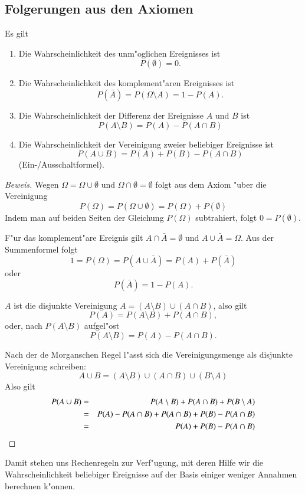 \subsection{Folgerungen aus den Axiomen}
\begin{satz}Es gilt
\begin{enumerate}
\item Die Wahrscheinlichkeit des unm"oglichen Ereignisses ist
\[
P(\emptyset) = 0.
\]
\item Die Wahrscheinlichkeit des komplement"aren Ereignisses
ist
\[
P(\bar A) = P(\Omega\setminus A) = 1 -P(A).
\]
\item Die Wahrscheinlichkeit der Differenz der Ereignisse $A$ und $B$
ist
\[
P(A\setminus B) = P(A) - P(A\cap B)
\]
\item Die Wahrscheinlichkeit der Vereinigung zweier beliebiger Ereignisse
ist
\[
P(A\cup B) = P(A) + P(B) - P(A\cap B)
\]
(Ein-/Ausschaltformel).
\end{enumerate}
\end{satz}

\begin{proof}[Beweis]
Wegen $\Omega = \Omega \cup\emptyset$ und
$\Omega\cap\emptyset = \emptyset$ folgt aus dem Axiom
"uber die Vereinigung 
\[
P(\Omega) = P(\Omega \cup \emptyset) = P(\Omega) + P(\emptyset)
\]
Indem man auf beiden Seiten der Gleichung $P(\Omega)$ subtrahiert,
folgt $0 = P(\emptyset)$.

F"ur das komplement"are Ereignis gilt $A\cap\bar A=\emptyset$ und
$A\cup\bar A=\Omega$. Aus der Summenformel folgt
\[
1 = P(\Omega) = P(A\cup\bar A) = P(A) + P(\bar A)
\]
oder
\[
P(\bar A) = 1 - P(A).
\]

$A$ ist die disjunkte Vereinigung $A=(A\setminus B) \cup (A\cap B)$,
also gilt
\[
P(A)=P(A\setminus B) + P(A\cap B),
\]
oder, nach $P(A\setminus B)$ aufgel"ost
\[
P(A\setminus B) = P(A) - P(A\cap B).
\]

Nach der de Morganschen Regel l"asst sich die Vereinigungsmenge
als disjunkte Vereinigung schreiben:
\[
A\cup B =  (A\setminus B) \cup (A\cap B) \cup (B\setminus A)
\]
Also gilt
\begin{eqnarray*}
P(A\cup B)&=&P(A\setminus B) + P(A\cap B) + P(B\setminus A)\\
&=&P(A) - P(A\cap B) + P(A\cap B) + P(B) - P(A\cap B)\\
&=&P(A) + P(B) - P(A\cap B)\qedhere\\
\end{eqnarray*}
\end{proof}
Damit stehen uns Rechenregeln zur Verf"ugung, mit deren Hilfe wir
die Wahrscheinlichkeit beliebiger Ereignisse auf der Basis einiger
weniger Annahmen berechnen k"onnen.

